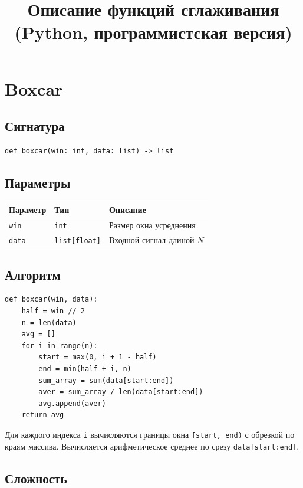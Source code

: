 \documentclass[12pt,a4paper]{article}
\title{\color{titleblue}\textbf{Описание функций сглаживания\\(Python, программистская версия)}}
\author{}
\date{}
\begin{document}
\maketitle

\section{Boxcar}

\subsection{Сигнатура}

\begin{lstlisting}
def boxcar(win: int, data: list) -> list
\end{lstlisting}

\subsection{Параметры}

\begin{center}
\begin{tabular}{|l|l|l|}
\hline
\textbf{Параметр} & \textbf{Тип} & \textbf{Описание} \\
\hline
\texttt{win}  & \texttt{int}         & Размер окна усреднения \\
\texttt{data} & \texttt{list[float]} & Входной сигнал длиной $N$ \\
\hline
\end{tabular}
\end{center}

\subsection{Алгоритм}

\begin{lstlisting}
def boxcar(win, data):
    half = win // 2
    n = len(data)
    avg = []
    for i in range(n):
        start = max(0, i + 1 - half)
        end = min(half + i, n)
        sum_array = sum(data[start:end])
        aver = sum_array / len(data[start:end])
        avg.append(aver)
    return avg
\end{lstlisting}

Для каждого индекса \texttt{i} вычисляются границы окна \texttt{[start, end)} с обрезкой по краям массива. Вычисляется арифметическое среднее по срезу \texttt{data[start:end]}.

\subsection{Сложность}
\end{document}
